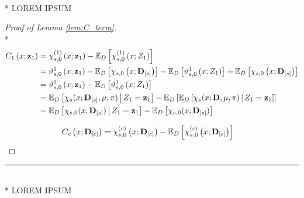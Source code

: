 \begin{lem}\label{lem:C_term}\mbox{}\\*
    {\color{red} LOREM IPSUM}
\end{lem}

\begin{proof}[Proof of Lemma \ref{lem:C_term}]\mbox{}\\*
    \begin{equation}
        \begin{aligned}
            C_{1}\left(x; \mathbf{z}_1\right)
            & = \chi_{s,0}^{(1)}\left(x; \mathbf{z}_{1}\right) - \mathbb{E}_{D}\left[\chi_{s,0}^{(1)}\left(x; Z_1\right)\right] \\
            & = \vartheta_{s,0}^{1}\left(x; \mathbf{z}_{1}\right) 
            - \mathbb{E}_{D}\left[\chi_{s,0}\left(x; \mathbf{D}_{[s]}\right)\right]
            - \mathbb{E}_{D}\left[\vartheta_{s,0}^{1}\left(x; Z_{1}\right)\right]
            + \mathbb{E}_{D}\left[\chi_{s,0}\left(x; \mathbf{D}_{[s]}\right)\right]\\
            & = \vartheta_{s,0}^{1}\left(x; \mathbf{z}_{1}\right) 
            - \mathbb{E}_{D}\left[\vartheta_{s,0}^{1}\left(x; Z_{1}\right)\right] \\
            & = \mathbb{E}_{D}\left[\chi_{s}(x; \mathbf{D}_{[s]}, \mu, \pi) \, \middle| \, Z_1 = \mathbf{z}_1\right]
            - \mathbb{E}_{D}\left[\mathbb{E}_{D}\left[\chi_{s}(x; \mathbf{D}, \mu, \pi) \, \middle| \, Z_1 = \mathbf{z}_1\right]\right]\\
            & = \mathbb{E}_{D}\left[\chi_{s,0}(x; \mathbf{D}_{[s]}) \, \middle| \, Z_1 = \mathbf{z}_1\right]
            - \mathbb{E}_{D}\left[\chi_{s,0}(x; \mathbf{D}_{[s]})\right]
        \end{aligned}
    \end{equation}

    \begin{equation}
        \begin{aligned}
            C_{c}\left(x; \mathbf{D}_{[c]}\right)
            & = \chi_{s,0}^{(c)}\left(x; \mathbf{D}_{[c]}\right) - \mathbb{E}_{D}\left[\chi_{s,0}^{(c)}\left(x; \mathbf{D}_{[c]}\right)\right]
        \end{aligned}
    \end{equation}
\end{proof}

\hrule

\begin{lem}\label{lem:D_resid}\mbox{}\\*
    {\color{red} LOREM IPSUM}
\end{lem}

